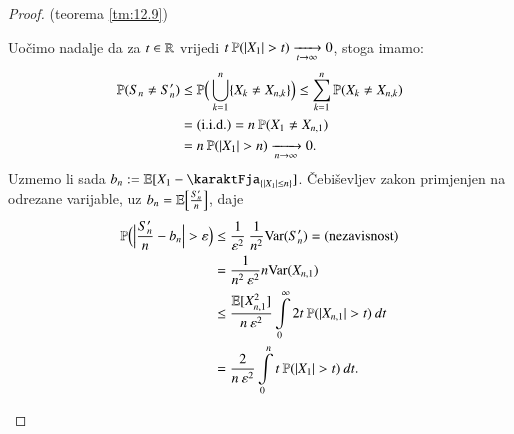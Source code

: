 \begin{proof}{(teorema \ref{tm:12.9})}
\begin{itemize}
\begin{equation*}
        \end{equation*}
        Uo\v cimo nadalje da za $t \in \mathbb{R}$ vrijedi $t \: \mathbb{P}({|X_1| > t}) \xrightarrow[t \to \infty]{} 0$, stoga imamo:
        \begin{equation*}
            \begin{aligned}
                \mathbb{P}({S_n \neq S_n'}) &\leq \mathbb{P} \Big( \bigcup\limits_{k = 1}^{n} \{ X_k \neq X_{n, k} \} \Big) \leq \sum\limits_{k = 1}^{n} \mathbb{P}({X_k \neq X_{n, k}})\\
                &= (\mathrm{i.i.d.}) = n \: \mathbb{P}({X_1 \neq X_{n, 1}})\\
                &= n \: \mathbb{P}({|X_1| > n}) \xrightarrow[n \to \infty]{} 0.
            \end{aligned}
        \end{equation*}
        Uzmemo li sada $b_n := \masE [X_1 - \karaktFja_{\{ |X_1| \leq n \}}] $.
        \v Cebi\v sevljev zakon primjenjen na odrezane varijable, uz $b_n = \mathbb{E} \Big[ \frac{S_n'}{n} \Big]$, daje
        \begin{equation*}
            \begin{aligned}
                \mathbb{P} \Big( \Big| \frac{S_n'}{n} - b_n \Big| > \varepsilon \Big) &\leq \frac{1}{\varepsilon^2} \: \frac{1}{n^2} \mathrm{Var} (S_n') = (\textnormal{nezavisnost})\\
                &= \frac{1}{n^2 \: \varepsilon^2} n \mathrm{Var} (X_{n, 1})\\
                &\leq \frac{\mathbb{E} [ X_{n, 1}^2 ]}{n \: \varepsilon^2} \int\limits_0^{\infty} 2 t \: \mathbb{P}({|X_{n, 1}| > t}) \: dt\\
                &= \frac{2}{n \: \varepsilon^2} \int\limits_0^n t \: \mathbb{P}({|X_1| > t}) \: dt.
            \end{aligned}
        \end{equation*}


\end{itemize}
\end{proof}
